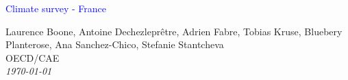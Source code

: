 



%
\usepackage{multicol}
              





\begin{frame}
\thispagestyle{empty}
\begin{center}
\begin{LARGE}
\textcolor{blue}{Climate survey - France}
\end{LARGE}

\vspace{1cm}


Laurence Boone, Antoine Dechezleprêtre, Adrien Fabre, Tobias Kruse, Bluebery Planterose, Ana Sanchez-Chico, Stefanie Stantcheva \\

OECD/CAE \\

\textit{\today} 

\end{center}

\bigskip

\end{frame}





